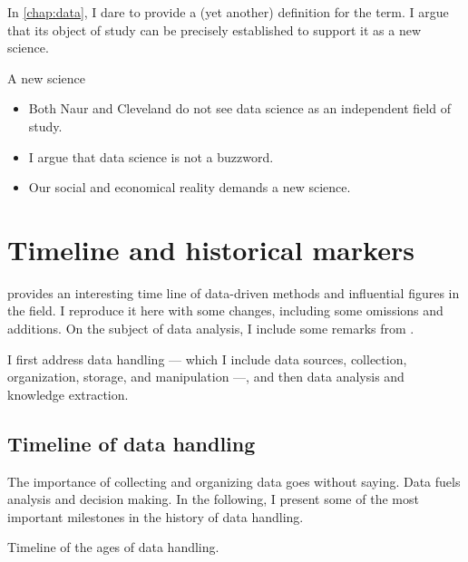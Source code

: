 In \cref{chap:data}, I dare to provide a (yet another) definition for the term.  I
argue that its object of study can be precisely established to support it as a new
science.

\begin{mainbox}{A new science}
  \begin{itemize}
    \item Both Naur and Cleveland do not see data science as an independent field of study.
    \item I argue that data science is not a buzzword.
    \item Our social and economical reality demands a new science.
  \end{itemize}
\end{mainbox}

\section{Timeline and historical markers}

\textcite{Kelleher2018} provides an interesting time line of data-driven methods and
influential figures in the field.  I reproduce it here with some changes, including
some omissions and additions.  On the subject of data analysis, I include some remarks
from \textcite{Vapnik1995}.

I first address data handling --- which I include data sources, collection, organization,
storage, and manipulation ---, and then data analysis and knowledge extraction.

\subsection{Timeline of data handling}

The importance of collecting and organizing data goes without saying.  Data fuels analysis and
decision making.  In the following, I present some of the most important milestones in the history
of data handling.

\begin{figurebox}[label=fig:data-handling-history]{Timeline of the ages of data handling.}
  \centering
\end{figurebox}

